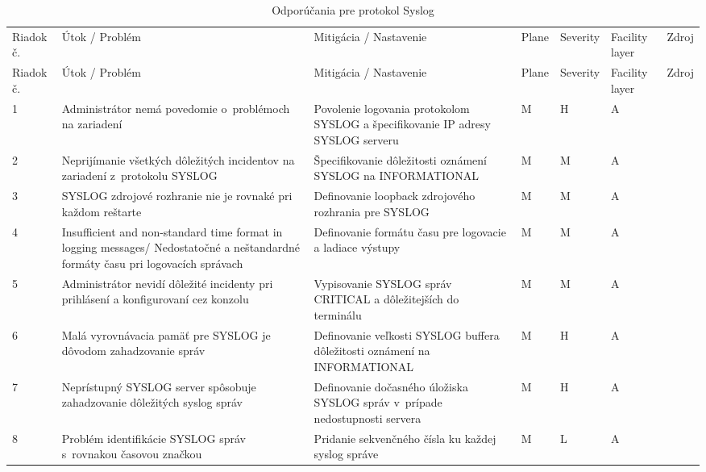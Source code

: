 \begin{longtable}[!htbp]{|C{2.5em}L{11em}L{11em}C{2.5em}C{4em}C{5em}L{2.5em}|}
	
	\caption{Odporúčania pre protokol Syslog}
	\label{tab:syslog}\\ \hline
	\mbox{Riadok} č.&Útok / Problém	&Mitigácia / Nastavenie	&Plane	&Severity	&Facility layer	&Zdroj\\ \hhline{=======}
	\endfirsthead 
	\hline
	\centering
	
	Riadok č.	&Útok / Problém	&Mitigácia / Nastavenie	&Plane	&Severity	&Facility layer	&Zdroj\\ \hhline{=======}
	\endhead
	
	 1	&Administrátor nemá povedomie o~problémoch na zariadení	&Povolenie logovania protokolom SYSLOG a špecifikovanie IP adresy SYSLOG serveru	&M	&H	&A	& \cite{CIS_DrTLsgXv24lxeIIM}
	
	\cite{Graesser2001}\\
	2	&Neprijímanie všetkých dôležitých incidentov na zariadení z~protokolu SYSLOG	&Špecifikovanie dôležitosti oznámení SYSLOG na INFORMATIONAL	&M	&M	&A	& \cite{CIS_DrTLsgXv24lxeIIM}\\
	 3	&SYSLOG zdrojové rozhranie nie je rovnaké pri každom reštarte	& Definovanie loopback zdrojového rozhrania pre SYSLOG	&M	&M	&A	& \cite{Singh2018}
	
	\cite{CIS_DrTLsgXv24lxeIIM}\\
	4	&Insufficient and non-standard  time format in logging messages/ Nedostatočné a neštandardné formáty času pri logovacích správach	&Definovanie formátu času pre logovacie a ladiace výstupy	&M	&M	&A	& \cite{CIS_DrTLsgXv24lxeIIM}
	
	\cite{Graesser2001}\\
	 5	&Administrátor nevidí dôležité incidenty pri prihlásení a konfigurovaní cez konzolu	&Vypisovanie SYSLOG správ CRITICAL a dôležitejších do terminálu	&M	&M	&A	& \cite{Singh2018}
	
	\cite{CIS_DrTLsgXv24lxeIIM}\\
	6	&Malá vyrovnávacia pamäť pre SYSLOG je dôvodom zahadzovanie správ	&Definovanie veľkosti SYSLOG buffera dôležitosti oznámení na INFORMATIONAL	&M	&H	&A	& \cite{Singh2018}\\
	 7	&Neprístupný SYSLOG server spôsobuje zahadzovanie dôležitých syslog správ	&Definovanie dočasného úložiska SYSLOG správ v~prípade nedostupnosti servera	&M	&H	&A	& \cite{Singh2018}\\
	8	&Problém identifikácie SYSLOG správ s~rovnakou časovou značkou	&Pridanie sekvenčného čísla ku každej syslog správe	&M	&L	&A	& \cite{Akin2002}\\
	
	\hline
\end{longtable}%

